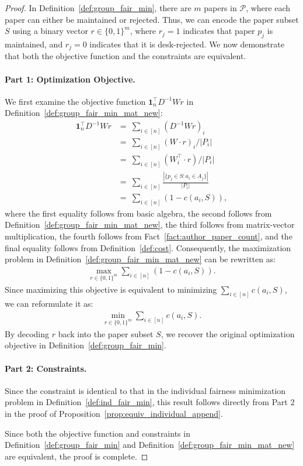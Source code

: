 \begin{proof}
     In Definition~\ref{def:group_fair_min}, there are $m$ papers in $\mathcal{P}$, where each paper can either be maintained or rejected. Thus, we can encode the paper subset $S$ using a binary vector $r \in \{0, 1\}^m$, where $r_j = 1$ indicates that paper $p_j$ is maintained, and $r_j = 0$ indicates that it is desk-rejected. We now demonstrate that both the objective function and the constraints are equivalent.

     \paragraph{Part 1: Optimization Objective.} We first examine the objective function $\mathbf{1}^\top_nD^{-1}Wr$ in Definition~\ref{def:group_fair_min_mat_new}:
     \begin{align*}
         \mathbf{1}^\top_nD^{-1}Wr &=~ \sum_{i\in[n]}(D^{-1}Wr)_i \\ 
         &=~\sum_{i\in[n]}(W\cdot r)_i / |P_i| \\
         &=~\sum_{i\in[n]}(W_i^\top\cdot r) / |P_i| \\
         &=~\sum_{i\in[n]}\frac{|\{p_j \in S: a_i \in A_j\}|}{|P_i|} \\ 
         &=~ \sum_{i\in[n]}(1-c(a_i,S)),
     \end{align*}
     where the first equality follows from basic algebra, the second follows from Definition~\ref{def:group_fair_min_mat_new}, the third follows from matrix-vector multiplication, the fourth follows from Fact~\ref{fact:author_paper_count}, and the final equality follows from Definition~\ref{def:cost}. Consequently, the maximization problem in Definition~\ref{def:group_fair_min_mat_new} can be rewritten as:
     \begin{align*}
        \max_{r \in \{0, 1\}^m} \sum_{i\in[n]}(1-c(a_i,S)).
     \end{align*}
     Since maximizing this objective is equivalent to minimizing $\sum_{i\in[n]} c(a_i,S)$, we can reformulate it as:
     \begin{align*}
         \min_{r \in \{0, 1\}^m} \sum_{i\in[n]} c(a_i,S).
     \end{align*}
     By decoding $r$ back into the paper subset $S$, we recover the original optimization objective in Definition~\ref{def:group_fair_min}. 

     \paragraph{Part 2: Constraints.} Since the constraint is identical to that in the individual fairness minimization problem in Definition~\ref{def:ind_fair_min}, this result follows directly from Part 2 in the proof of Proposition~\ref{prop:equiv_individual_append}.

     Since both the objective function and constraints in Definition~\ref{def:group_fair_min} and Definition~\ref{def:group_fair_min_mat_new} are equivalent, the proof is complete.
\end{proof}

